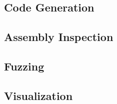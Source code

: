 \subsection{Code Generation}
\subsection{Assembly Inspection}
\subsection{Fuzzing}
\subsection{Visualization}